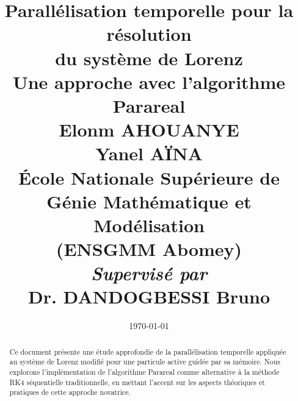 \documentclass[11pt,a4paper]{article}
\title{%
    \textcolor{primaryblue}{\Huge\textbf{Parallélisation temporelle pour la résolution\\du système de Lorenz}}\\[1cm]
    \textcolor{secondaryblue}{\Large Une approche avec l'algorithme Parareal}\\[1cm]
    \vspace{0.5cm}
    \Large\textcolor{tertiarygreen}{
        Elonm AHOUANYE\\
        Yanel AÏNA\\[0.5cm]
        École Nationale Supérieure de Génie Mathématique et Modélisation\\
        (ENSGMM Abomey)\\[0.5cm]
        \large\textit{Supervisé par}\\
        \normalsize{Dr. DANDOGBESSI Bruno}\\
    }
}
\date{\today}
\begin{document}
\maketitle
\thispagestyle{empty}

\clearpage
\begin{abstract}
Ce document présente une étude approfondie de la parallélisation temporelle appliquée au système de Lorenz modifié pour une particule active guidée par sa mémoire. Nous explorons l'implémentation de l'algorithme Parareal comme alternative à la méthode RK4 séquentielle traditionnelle, en mettant l'accent sur les aspects théoriques et pratiques de cette approche novatrice.
\end{abstract}

\setcounter{tocdepth}{2}
\tableofcontents
\clearpage


\clearpage


\clearpage


\clearpage


\clearpage


\clearpage


\clearpage

\printbibliography[title=Références]
\end{document}

